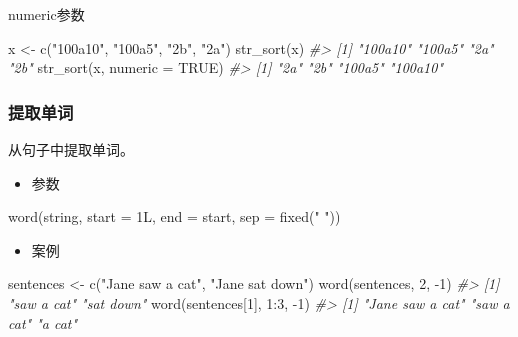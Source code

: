 \documentclass[
]{book}
\newenvironment{Shaded}{\begin{snugshade}}{\end{snugshade}}
\newcommand{\AttributeTok}[1]{\textcolor[rgb]{0.77,0.63,0.00}{#1}}
\newcommand{\CommentTok}[1]{\textcolor[rgb]{0.56,0.35,0.01}{\textit{#1}}}
\newcommand{\ConstantTok}[1]{\textcolor[rgb]{0.00,0.00,0.00}{#1}}
\newcommand{\DecValTok}[1]{\textcolor[rgb]{0.00,0.00,0.81}{#1}}
\newcommand{\FunctionTok}[1]{\textcolor[rgb]{0.00,0.00,0.00}{#1}}
\newcommand{\NormalTok}[1]{#1}
\newcommand{\OtherTok}[1]{\textcolor[rgb]{0.56,0.35,0.01}{#1}}
\newcommand{\SpecialCharTok}[1]{\textcolor[rgb]{0.00,0.00,0.00}{#1}}
\newcommand{\StringTok}[1]{\textcolor[rgb]{0.31,0.60,0.02}{#1}}
\providecommand{\tightlist}{%
  \setlength{\itemsep}{0pt}\setlength{\parskip}{0pt}}
\begin{document}
numeric参数

\begin{Shaded}
\begin{Highlighting}[]
\NormalTok{x }\OtherTok{\textless{}{-}} \FunctionTok{c}\NormalTok{(}\StringTok{"100a10"}\NormalTok{, }\StringTok{"100a5"}\NormalTok{, }\StringTok{"2b"}\NormalTok{, }\StringTok{"2a"}\NormalTok{)}
\FunctionTok{str\_sort}\NormalTok{(x)}
\CommentTok{\#\textgreater{} [1] "100a10" "100a5"  "2a"     "2b"}
\FunctionTok{str\_sort}\NormalTok{(x, }\AttributeTok{numeric =} \ConstantTok{TRUE}\NormalTok{)}
\CommentTok{\#\textgreater{} [1] "2a"     "2b"     "100a5"  "100a10"}
\end{Highlighting}
\end{Shaded}

\hypertarget{ux63d0ux53d6ux5355ux8bcd}{%
\subsubsection{提取单词}\label{ux63d0ux53d6ux5355ux8bcd}}

从句子中提取单词。

\begin{itemize}
\tightlist
\item
  参数
\end{itemize}

\begin{Shaded}
\begin{Highlighting}[]
\FunctionTok{word}\NormalTok{(string, }\AttributeTok{start =}\NormalTok{ 1L, }\AttributeTok{end =}\NormalTok{ start, }\AttributeTok{sep =} \FunctionTok{fixed}\NormalTok{(}\StringTok{" "}\NormalTok{))}
\end{Highlighting}
\end{Shaded}

\begin{itemize}
\tightlist
\item
  案例
\end{itemize}

\begin{Shaded}
\begin{Highlighting}[]
\NormalTok{sentences }\OtherTok{\textless{}{-}} \FunctionTok{c}\NormalTok{(}\StringTok{"Jane saw a cat"}\NormalTok{, }\StringTok{"Jane sat down"}\NormalTok{)}
\FunctionTok{word}\NormalTok{(sentences, }\DecValTok{2}\NormalTok{, }\SpecialCharTok{{-}}\DecValTok{1}\NormalTok{)}
\CommentTok{\#\textgreater{} [1] "saw a cat" "sat down"}
\FunctionTok{word}\NormalTok{(sentences[}\DecValTok{1}\NormalTok{], }\DecValTok{1}\SpecialCharTok{:}\DecValTok{3}\NormalTok{, }\SpecialCharTok{{-}}\DecValTok{1}\NormalTok{)}
\CommentTok{\#\textgreater{} [1] "Jane saw a cat" "saw a cat"      "a cat"}
\end{Highlighting}
\end{Shaded}
\end{document}
